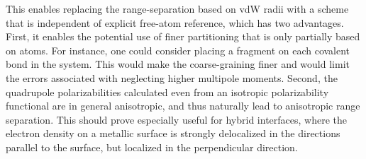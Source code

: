 \begin{description}
This enables replacing the range-separation based on vdW radii with a scheme that is independent of explicit free-atom reference, which has two advantages.
First, it enables the potential use of finer partitioning that is only partially based on atoms.
For instance, one could consider placing a fragment on each covalent bond in the system.
This would make the coarse-graining finer and would limit the errors associated with neglecting higher multipole moments.
Second, the quadrupole polarizabilities calculated even from an isotropic polarizability functional are in general anisotropic, and thus naturally lead to anisotropic range separation.
This should prove especially useful for hybrid interfaces, where the electron density on a metallic surface is strongly delocalized in the directions parallel to the surface, but localized in the perpendicular direction.
\end{description}

